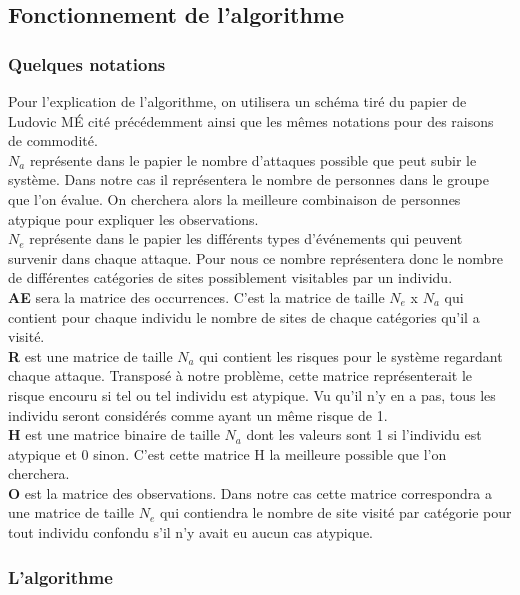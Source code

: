 \documentclass[a4paper, 11pt]{article}
\begin{document}
\subsection{Fonctionnement de l'algorithme}

\subsubsection{Quelques notations}
Pour l'explication de l'algorithme, on utilisera un schéma tiré du papier de Ludovic MÉ cité précédemment ainsi que les mêmes notations pour des raisons de commodité.\\

\textbf{$N_a$} représente dans le papier le nombre d'attaques possible que peut subir le système. Dans notre cas il représentera le nombre de personnes dans le groupe que l'on évalue. On cherchera alors la meilleure combinaison de personnes atypique pour expliquer les observations.\\

\textbf{$N_e$} représente dans le papier les différents types d'événements qui peuvent survenir dans chaque attaque. Pour nous ce nombre représentera donc le nombre de différentes catégories de sites possiblement visitables par un individu.\\

\textbf{AE} sera la matrice des occurrences. C'est la matrice de taille $N_e$ x $N_a$ qui contient pour chaque individu le nombre de sites de chaque catégories qu'il a visité.\\

\textbf{R} est une matrice de taille $N_a$ qui contient les risques pour le système regardant chaque attaque. Transposé à notre problème, cette matrice représenterait le risque encouru si tel ou tel individu est atypique. Vu qu'il n'y en a pas, tous les individu seront considérés comme ayant un même risque de 1.\\

\textbf{H} est une matrice binaire de taille $N_a$ dont les valeurs sont 1 si l'individu est atypique et 0 sinon. C'est cette matrice H la meilleure possible que l'on cherchera.\\

\textbf{O} est la matrice des observations. Dans notre cas cette matrice correspondra a une matrice de taille $N_e$ qui contiendra le nombre de site visité par catégorie pour tout individu confondu s'il n'y avait eu aucun cas atypique.


\subsubsection{L'algorithme}
\end{document}
